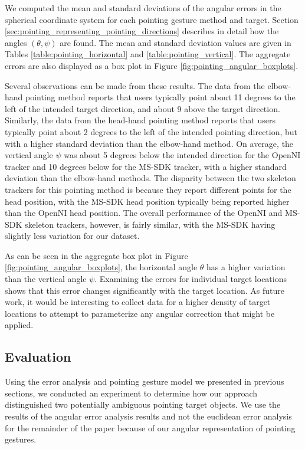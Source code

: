 \documentclass[12pt]{gatech-thesis}
\begin{document}
We computed the mean and standard deviations of the angular errors in the spherical coordinate system for each pointing gesture method and target. Section \ref{sec:pointing_representing_pointing_directions} describes in detail how the angles $(\theta, \psi)$ are found. The mean and standard deviation values are given in Tables \ref{table:pointing_horizontal} and \ref{table:pointing_vertical}.  The aggregate errors are also displayed as a  box plot in Figure \ref{fig:pointing_angular_boxplots}.

Several observations can be made from these results. The data from the elbow-hand pointing method reports that users typically point about 11 degrees to the left of the intended target direction, and about 9 above the target direction. Similarly, the data from the head-hand pointing method reports that users typically point about 2 degrees to the left of the intended pointing direction, but with a higher standard deviation than the elbow-hand method.  On average, the vertical angle $\psi$ was about 5 degrees below the intended direction for the OpenNI tracker and 10 degrees below for the MS-SDK tracker, with a higher standard deviation than the elbow-hand methods.  The disparity between the two skeleton trackers for this pointing method is because they report different points for the head position, with the MS-SDK head position typically being reported higher than the OpenNI head position. The overall performance of the OpenNI and MS-SDK skeleton trackers, however, is fairly similar, with the MS-SDK having slightly less variation for our dataset.

As can be seen in the aggregate box plot in Figure \ref{fig:pointing_angular_boxplots}, the horizontal angle $\theta$ has a higher variation than the vertical angle $\psi$.  Examining the errors for individual target locations shows that this error changes significantly with the target location.  As future work, it would be interesting to collect data for a higher density of target locations to attempt to parameterize any angular correction that might be applied.

\subsection{Evaluation}
\label{sec:pointing_evaluation}

Using the error analysis and pointing gesture model we presented in previous sections, we conducted an experiment to  determine how our approach distinguished two potentially ambiguous pointing target objects. We use the results of the angular error analysis results and not the euclidean error analysis for the remainder of the paper because of our angular representation of pointing gestures.
\end{document}
